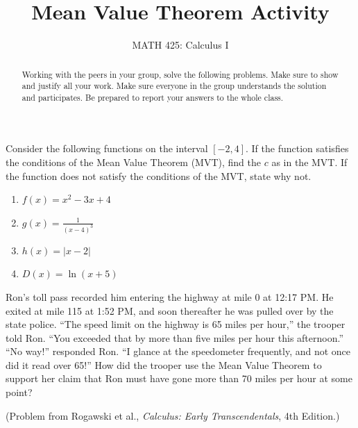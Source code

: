 \documentclass{ximera}
\title{Mean Value Theorem Activity}
\author{MATH 425: Calculus I}
\begin{document}
\begin{abstract}
   Working with the peers in your group, solve the following problems. Make sure to show and justify all your work. Make sure everyone in the group understands the solution and participates. Be prepared to report your answers to the whole class. 
\end{abstract}
\maketitle


\begin{exercise}
   Consider the following functions on the interval $[-2,4]$.  If the function satisfies the conditions of the Mean Value Theorem (MVT), find the $c$ as in the MVT.  If the function does not satisfy the conditions of the MVT, state why not.  
    \begin{enumerate}
       \item $f(x)=x^2-3x+4$\\
       \item $g(x)=\frac{1}{(x-4)^3}$\\
       \item $h(x)=|x-2|$\\
       \item $D(x)=\ln(x+5)$\\
    \end{enumerate}

\end{exercise}

\begin{exercise}
   Ron’s toll pass recorded him entering the highway at mile 0 at 12:17 PM. He exited at mile 115 at 1:52 PM, and soon thereafter he was pulled over by the state police. “The speed limit on the highway is 65 miles per hour,” the trooper told Ron. “You exceeded that by more than five miles per hour this afternoon.” “No way!” responded Ron. “I glance at the speedometer frequently, and not once did it read over 65!” How did the trooper use the Mean Value Theorem to support her claim that Ron must have gone more than 70 miles per hour at some point? 

(Problem from Rogawski et al., \textit{Calculus: Early Transcendentals}, 4th Edition.)
\end{exercise}
\end{document}
